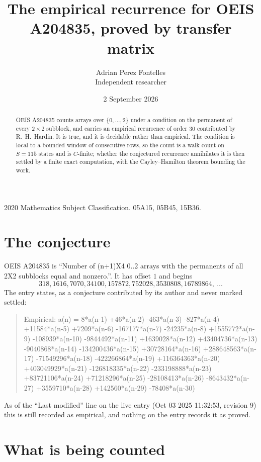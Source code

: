 \documentclass[11pt,a4paper]{article}
\title{The empirical recurrence for OEIS A204835, proved by transfer matrix}
\author{Adrian Perez Fontelles\\ \small Independent researcher}
\date{2 September 2026}
\theoremstyle{plain}
\theoremstyle{definition}
\begin{document}
\maketitle

\begin{abstract}
OEIS A204835 counts arrays over $\{0,\dots,2\}$ under a condition on the permanent of every
$2\times2$ subblock, and carries an empirical recurrence of order $30$ contributed by
R.~H.~Hardin. It is true, and it is decidable rather than empirical. The condition is local to
a bounded window of consecutive rows, so the count is a walk count on $S=115$ states and is
$C$-finite; whether the conjectured recurrence annihilates it is then settled by a finite exact
computation, with the Cayley--Hamilton theorem bounding the work.
\end{abstract}

\noindent\small 2020 Mathematics Subject Classification. 05A15, 05B45, 15B36.\normalsize

\section{The conjecture}

OEIS A204835 is ``Number of (n+1)X4 0..2 arrays with the permanents of all 2X2 subblocks equal and nonzero.''. It has offset $1$ and begins
\[
318, 1616, 7070, 34100, 157872, 752028, 3530808, 16789864,\ \dots
\]
The entry states, as a conjecture contributed by its author and never marked settled:
\begin{quote}
Empirical: a(n) = 8*a(n-1) +46*a(n-2) -463*a(n-3) -827*a(n-4) +11584*a(n-5) +7209*a(n-6) -167177*a(n-7) -24235*a(n-8) +1555772*a(n-9) -108939*a(n-10) -9844492*a(n-11) +1639028*a(n-12) +43404736*a(n-13) -9040868*a(n-14) -134200436*a(n-15) +30728164*a(n-16) +288648563*a(n-17) -71549296*a(n-18) -422266864*a(n-19) +116364363*a(n-20) +403049929*a(n-21) -126818335*a(n-22) -233198888*a(n-23) +83721106*a(n-24) +71218296*a(n-25) -28108413*a(n-26) -8643432*a(n-27) +3559710*a(n-28) +142560*a(n-29) -78408*a(n-30)
\end{quote}
As of the ``Last modified'' line on the live entry (Oct 03 2025 11:32:53, revision 9) this is still
recorded as empirical, and nothing on the entry records it as proved.

\section{What is being counted}
\end{document}
